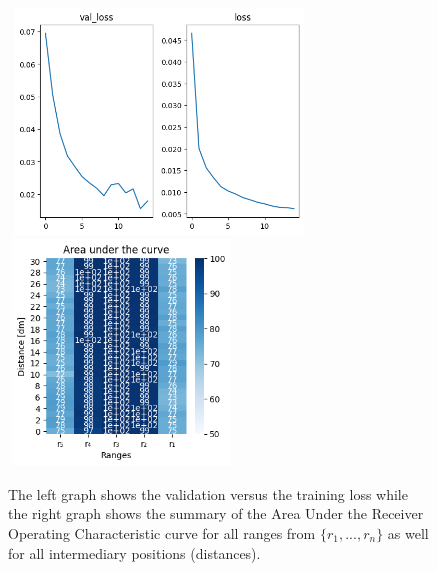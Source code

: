\begin{multicols}{2}
\end{multicols}\begin{figure}[H]%
\centering
\includegraphics[width=8cm,height=6cm]{3_models/models_5/graph_5.png}
\hspace{0.2 cm}
\includegraphics[width=6cm,height=6cm]{4_plots/plots_5/AUC_5.png}
\caption{The left graph shows the validation versus the training loss while the right graph shows the summary of the Area Under the Receiver Operating Characteristic curve for all ranges from $\{r_{1}, ... ,r_{n}\}$ as well for all intermediary positions (distances).}
\label{auc_7}
\end{figure}

\newpage
